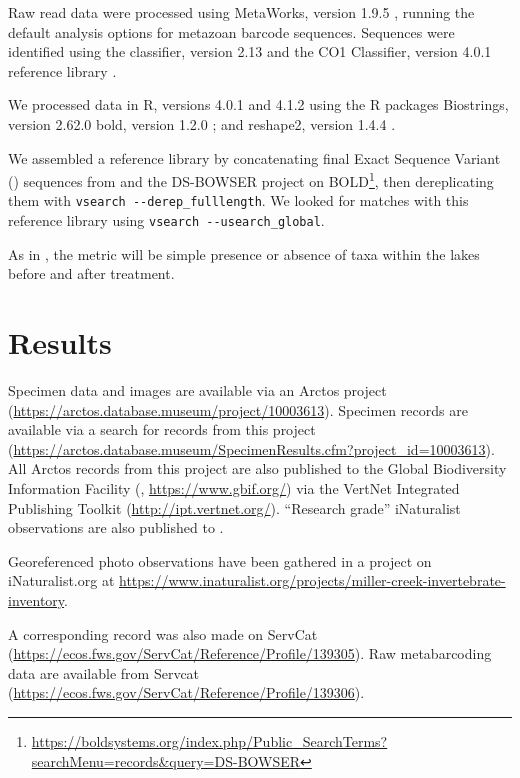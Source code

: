 \begin{multicols}{2}
Raw read data were processed using MetaWorks, version 1.9.5 \citep{PorterHajibabaei2020}, running the default analysis options for metazoan   barcode sequences. Sequences were identified using the  classifier, version 2.13 \citep{Wangetal2007} and the CO1 Classifier, version 4.0.1 reference library \citep{Porter2017, PorterHajibabaei2018}. 

We processed data in R, versions 4.0.1 and 4.1.2 \citep{RCoreTeam2021} using the R packages Biostrings, version 2.62.0 \citep{Pagesetal2021} bold, version 1.2.0 \citep{Chamberlain2021}; and reshape2, version 1.4.4 \citep{Wickham2007}.

We assembled a reference library by concatenating final Exact Sequence Variant () sequences from \citet{Bowseretal2020, BowserBowser2020} and the DS-BOWSER project on BOLD\footnote{\url{https://boldsystems.org/index.php/Public_SearchTerms?searchMenu=records&query=DS-BOWSER}}, then dereplicating them with \verb|vsearch --derep_fulllength|. We looked for matches with this reference library using \verb|vsearch --usearch_global|.

As in \citet{Massengill2014, Massengill2017}, the metric will be simple presence or absence of taxa within the lakes before and after treatment.

\section{Results}

Specimen data and images are available via an Arctos project (\url{https://arctos.database.museum/project/10003613}). Specimen records are available via a search for records from this project (\url{https://arctos.database.museum/SpecimenResults.cfm?project_id=10003613}). All Arctos records from this project are also published to the Global Biodiversity Information Facility (, \url{https://www.gbif.org/}) via the VertNet Integrated Publishing Toolkit (\url{http://ipt.vertnet.org/}). ``Research grade'' iNaturalist observations are also published to .

Georeferenced photo observations have been gathered in a project on iNaturalist.org at \url{https://www.inaturalist.org/projects/miller-creek-invertebrate-inventory}.

A corresponding record was also made on ServCat (\url{https://ecos.fws.gov/ServCat/Reference/Profile/139305}). Raw metabarcoding data are available from Servcat (\url{https://ecos.fws.gov/ServCat/Reference/Profile/139306}).

\end{multicols}

